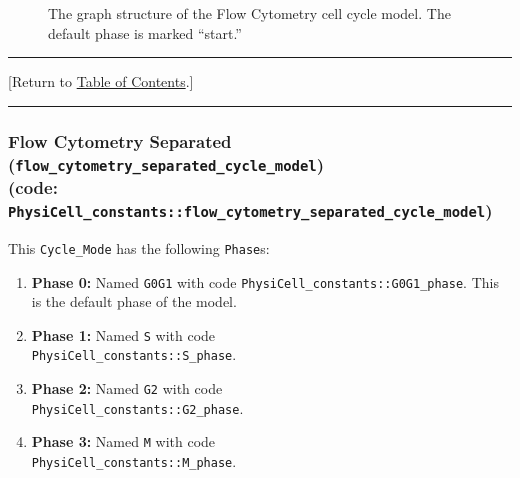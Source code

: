 \documentclass[12pt]{article}
\renewcommand{\v}{\verb}
\newcommand{\TOClink}{\begin{center}\hrule\vskip-10pt\phantom{.}\hfill[Return to \hyperlink{TOC}{Table of Contents}.]\hfill\phantom{.}\vskip3pt\hrule\end{center}}
\begin{document}
\begin{figure}
\begin{mdframed}[style=mystyle]
\caption{The graph structure of the Flow Cytometry cell cycle model. The default phase is marked 
``start.''}
\label{fig:cycle_model:flow_cytometry}
\end{mdframed}
\end{figure}

\TOClink 


\subsubsection{Flow Cytometry Separated (\texttt{flow\_cytometry\_separated\_cycle\_model})\\
(code: \texttt{PhysiCell\_constants::flow\_cytometry\_separated\_cycle\_model})}
\label{sec:Standard_Models:Flow_Cytometry_Separated}
This \v|Cycle_Mode| has the following \v|Phase|s: 
\begin{enumerate}
\item 
\textbf{Phase 0:} Named \v|G0G1| with code \v|PhysiCell_constants::G0G1_phase|. This is the default 
phase of the model. 

\item 
\textbf{Phase 1:} Named \v|S| with code \\ \v|PhysiCell_constants::S_phase|. 

\item 
\textbf{Phase 2:} Named \v|G2| with code \\ \v|PhysiCell_constants::G2_phase|. 

\item 
\textbf{Phase 3:} Named \v|M| with code \\ \v|PhysiCell_constants::M_phase|. 

\end{enumerate}
\end{document}
